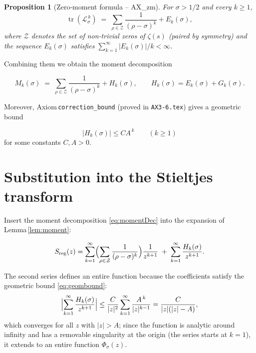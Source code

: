 \documentclass[11pt,a4paper]{article}
\newtheorem{proposition}[theorem]{Proposition}
\theoremstyle{definition}
\newcommand{\Z}{\mathcal{Z}}
\newcommand{\LOp}{\mathcal{L}}
\newcommand{\tr}{\operatorname{tr}}
\begin{document}
\begin{proposition}[Zero‑moment formula -- AX\_zm]\label{prop:zm}
For \(\sigma > 1/2\) and every \(k \ge 1\),
\begin{equation}\label{eq:zm}
\tr(\LOp_\sigma^{\,k}) \;=\; \sum_{\rho \in \Z} \frac{1}{(\rho-\sigma)^k}
+ E_k(\sigma),
\end{equation}
where \(\Z\) denotes the set of non‑trivial zeros of \(\zeta(s)\)
(paired by symmetry) and the sequence \(E_k(\sigma)\) satisfies
\(\sum_{k=1}^\infty |E_k(\sigma)|/k < \infty\).
\end{proposition}

Combining them we obtain the moment decomposition

\begin{equation}\label{eq:momentDec}
M_k(\sigma) \;=\; \sum_{\rho \in \Z} \frac{1}{(\rho-\sigma)^k} + H_k(\sigma),
\qquad
H_k(\sigma) = E_k(\sigma) + G_k(\sigma).
\end{equation}

Moreover, Axiom \texttt{correction\_bound} (proved in
\texttt{AX3‑6.tex}) gives a geometric bound

\begin{equation}\label{eq:geombound}
|H_k(\sigma)| \le C A^{\,k} \qquad (k \ge 1)
\end{equation}
for some constants \(C, A > 0\).

\section{Substitution into the Stieltjes transform}
Insert the moment decomposition \eqref{eq:momentDec} into the expansion
of Lemma \ref{lem:moment}:

\begin{equation}\label{eq:Sexpand}
S_{\mathrm{reg}}(z) = \sum_{k=1}^\infty
\Bigl( \sum_{\rho \in \Z} \frac{1}{(\rho-\sigma)^k} \Bigr)
\frac{1}{z^{k+1}}
\;+\; \sum_{k=1}^\infty \frac{H_k(\sigma)}{z^{k+1}} .
\end{equation}

The second series defines an entire function because the coefficients
satisfy the geometric bound \eqref{eq:geombound}:
\[
\Bigl| \sum_{k=1}^\infty \frac{H_k(\sigma)}{z^{k+1}} \Bigr|
\le \frac{C}{|z|^2} \sum_{k=1}^\infty \frac{A^{\,k}}{|z|^{k-1}}
= \frac{C}{|z|(|z|-A)},
\]
which converges for all \(z\) with \(|z| > A\); since the function is
analytic around infinity and has a removable singularity at the origin
(the series starts at \(k=1\)), it extends to an entire function
\(\Phi_\sigma(z)\).
\end{document}
